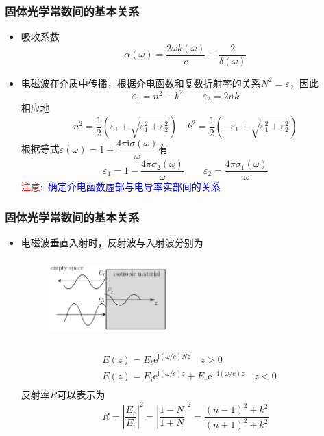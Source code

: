 \frame
{
	\frametitle{固体光学常数间的基本关系}
	\begin{itemize}
		\item 吸收系数
			\begin{displaymath}
				\alpha(\omega)=\frac{2\omega k(\omega)}c\equiv\frac2{\delta(\omega)}
			\end{displaymath}
		\item 电磁波在介质中传播，根据介电函数和复数折射率的关系$N^2=\varepsilon$，因此
			\begin{displaymath}
				\varepsilon_1=n^2-k^2\qquad\varepsilon_2=2nk
			\end{displaymath}
			相应地
			\begin{displaymath}
				n^2=\frac12(\varepsilon_1+\sqrt{\varepsilon_1^2+\varepsilon_2^2})\quad k^2=\frac12(-\varepsilon_1+\sqrt{\varepsilon_1^2+\varepsilon_2^2})
			\end{displaymath}
			根据等式$\varepsilon(\omega)=1+\dfrac{4\pi\mathrm{i}\sigma(\omega)}{\omega}$有
			\begin{displaymath}
				\varepsilon_1=1-\frac{4\pi\sigma_2(\omega)}{\omega}\qquad\varepsilon_2=\frac{4\pi\sigma_1(\omega)}{\omega} 
			\end{displaymath}
			\textcolor{red}{注意}:~\textcolor{blue}{确定介电函数虚部与电导率实部间的关系}
	\end{itemize}
}

\frame
{
	\frametitle{固体光学常数间的基本关系}
	\begin{itemize}
		\item 电磁波垂直入射时，反射波与入射波分别为
\begin{figure}[h!]
\centering
\vspace*{-0.4in}
\includegraphics[height=1.2in,width=1.8in,viewport=0 0 750 600,clip]{Figures/Optic-reflect.png}
\caption{\fontsize{5.5pt}{4.2pt}}%
\label{Optic-reflect}
\end{figure} 
			\begin{displaymath}
				\begin{aligned}
					&E(z)=E_t\mathrm{e}^{\mathrm{i}(\omega/c)Nz}\quad z>0\\
					&E(z)=E_i\mathrm{e}^{\mathrm{i}(\omega/c)z}+E_r\mathrm{e}^{-\mathrm{i}(\omega/c)z}\quad z<0\\
				\end{aligned}
			\end{displaymath}
			反射率$R$可以表示为
			\begin{displaymath}
				R=\left|\frac{E_r}{E_i}\right|^2=\left|\frac{1-N}{1+N}\right|^2=\frac{(n-1)^2+k^2}{(n+1)^2+k^2}
			\end{displaymath}
	\end{itemize}
}

